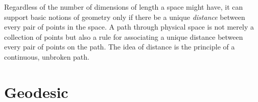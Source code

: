 \documentclass[nobib]{tufte-book}
\begin{document}
Regardless of the number of dimensions of length a space might have, it can
support basic notions of geometry only if there be a unique \emph{distance}
between every pair of points in the space.  A path through physical space is
not merely a collection of points but also a rule for associating a unique
distance between every pair of points on the path.  The idea of distance is the
principle of a continuous, unbroken path.

\section{Geodesic}

\appendix

\backmatter






\printindex
\end{document}
